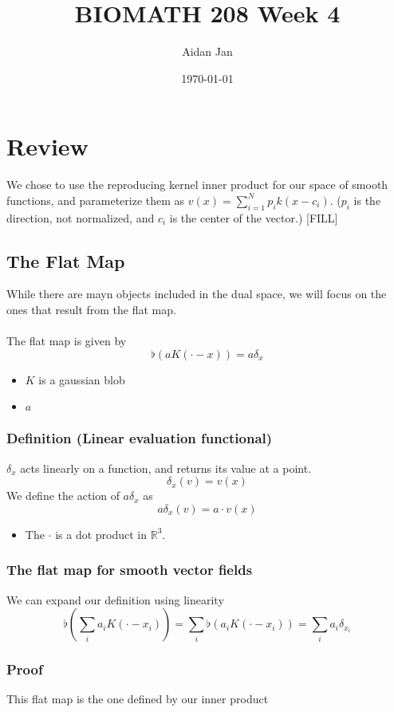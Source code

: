 \documentclass[10pt]{article}
\title{BIOMATH 208 Week 4}
\author{Aidan Jan}
\date{\today}
\newcommand{\R}{\mathbb{R}}
\begin{document}
\maketitle
\section*{Review}
We chose to use the reproducing kernel inner product for our space of smooth functions, and parameterize them as $v(x) = \sum_{i = 1}^N p_i k(x - c_i)$.  ($p_i$ is the direction, not normalized, and $c_i$ is the center of the vector.)  
[FILL]

\subsection*{The Flat Map}
While there are mayn objects included in the dual space, we will focus on the ones that result from the flat map.\\\\
The flat map is given by 
\[\flat(aK(\cdot - x)) = a \delta_x\]
\begin{itemize}
    \item $K$ is a gaussian blob
    \item $a$
\end{itemize}
\subsubsection*{Definition (Linear evaluation functional)}
$\delta_x$ acts linearly on a function, and returns its value at a point.
\[\delta_x(v) = v(x)\]
We define the action of $a\delta_x$ as
\[a\delta_x(v) = a \cdot v(x)\]
\begin{itemize}
    \item The $\cdot$ is a dot product in $\R^3$.
\end{itemize}
\subsubsection*{The flat map for smooth vector fields}
We can expand our definition using linearity
\[\flat\left(\sum_i a_i K(\cdot - x_i)\right) = \sum_i \flat(a_i K(\cdot - x_i)) = \sum_i a_i \delta_{x_i}\]
\subsubsection*{Proof}
This flat map is the one defined by our inner product
\begin{align*}
    [FILL]
\end{align*}
\end{document}
